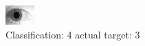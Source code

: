 \begin{figure}[h!]
\begin{center}
\includegraphics[width=0.60\columnwidth]{figures/ID1970_class_4_target_3.png}
\end{center}
\caption{ Classification: 4 actual target: 3}
\label{fig:ID1970_class_4_target_3}
\end{figure}
